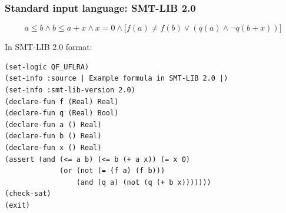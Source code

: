 \documentclass[svgnames,table,mathserif]{beamer}
\begin{document}
\begin{frame}[fragile]
  \frametitle{Standard input language: SMT-LIB 2.0}
  
  \begin{displaymath}
    a \leq b \wedge b \leq a + x \wedge x = 0 \wedge
    \big[ f(a) \neq f(b) \vee (q(a) \wedge \neg q(b + x)) \big]
  \end{displaymath}

\vspace*{5pt}
In SMT-LIB 2.0 format:
{\footnotesize
\begin{verbatim}
(set-logic QF_UFLRA)
(set-info :source | Example formula in SMT-LIB 2.0 |)
(set-info :smt-lib-version 2.0)
(declare-fun f (Real) Real)
(declare-fun q (Real) Bool)
(declare-fun a () Real)
(declare-fun b () Real)
(declare-fun x () Real)
(assert (and (<= a b) (<= b (+ a x)) (= x 0)
             (or (not (= (f a) (f b)))
                 (and (q a) (not (q (+ b x)))))))
(check-sat)
(exit)
\end{verbatim}
}

\end{frame}



\end{document}
